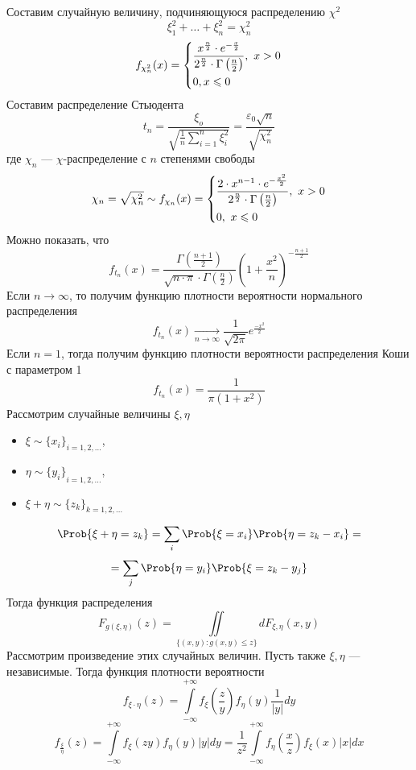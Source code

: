 Составим случайную величину, подчиняющуюся распределению $\chi^2$
\[
	\xi_1^2 + \ldots + \xi_n^2 = \chi_n^2
\]
\[
	f_{\chi_n^2} (x) = \begin{dcases*}
	\frac{x^{\frac{n}{2}} \cdot e^{-\frac{x}{2}} }{2^{\frac{n}{2}} \cdot \Gamma \left( \frac{n}{2} \right)}, \ x > 0 \\
	0, x \leqslant 0
	\end{dcases*}
\]
Составим распределение Стьюдента
\[
	t_n = \frac{\xi_o}{\sqrt{\frac{1}{n} \sum\limits_{i=1}^{n} \xi_i^2}} = \frac{\varepsilon_0 \sqrt{n}}{\sqrt{\chi_n^2}} 
\]
где $\chi_n$ --- $\chi$-распределение с $n$ степенями свободы
\[
	\chi_n = \sqrt{\chi_n^2} \sim f_{\chi_n} (x) = \begin{dcases*}
	\frac{2 \cdot x^{n-1} \cdot e^{-\frac{x^2}{2}}}{2^{\frac{n}{2}} \cdot \Gamma \left( \frac{n}{2} \right)}, \ x > 0\\
	0, \ x \leqslant 0
	\end{dcases*}
\]
Можно показать, что
\[
	f_{t_n} (x) = \frac{\Gamma \left( \frac{n + 1}{2} \right)}{\sqrt{n \cdot \pi} \cdot \Gamma \left( \frac{n}{2} \right)} \left( 1 + \frac{x^2}{n} \right)^{-\frac{n+1}{2}}
\]
Если $n \to \infty$, то получим функцию плотности вероятности нормального распределения
\[
	f_{t_n} (x) \underset{n \to \infty}{\rightarrow} \frac{1}{\sqrt{2\pi}} e^{\frac{-x^2}{2}}
\]
Если $n = 1$, тогда получим функцию плотности вероятности распределения Коши с параметром 1
\[
	f_{t_n} (x) = \frac{1}{\pi (1 + x^2)}
\]
Рассмотрим случайные величины $\xi, \eta$
\begin{itemize}
	\item $\xi \sim {\{ x_i \}}_{i = 1, 2, \ldots}$,
	\item $\eta \sim {\{ y_i \}}_{i = 1, 2, \ldots}$,
	\item $\xi + \eta \sim {\{ z_k \}}_{k = 1, 2, \ldots}$
\end{itemize}
\[
	\Prob \{ \xi + \eta = z_k \} = \sum\limits_{i} \Prob \{ \xi = x_i \} \Prob \{ \eta = z_k - x_i \} = 
\]
\[
	= \sum\limits_{j} \Prob \{ \eta = y_i \} \Prob \{ \xi = z_k - y_j \}
\]
Тогда функция распределения
\[
	F_{g(\xi, \eta)} (z) = \iint\limits_{\{ (x, y) : g(x, y) \leqslant z \}} dF_{\xi, \eta} (x, y)
\]
Рассмотрим произведение этих случайных величин. Пусть также $\xi, \eta$ --- независимые. Тогда функция плотности вероятности
\[
	f_{\xi \cdot \eta} (z) = \int\limits_{-\infty}^{+\infty} f_{\xi} (\frac{z}{y}) f_{\eta} (y) \frac{1}{|y|} dy
\]
\[
	f_{\frac{\xi}{\eta}} (z) = \int\limits_{-\infty}^{+\infty} f_{\xi} (zy) f_{\eta} (y) |y| dy = \frac{1}{z^2} \int\limits_{-\infty}^{+\infty} f_{\eta} \left(\frac{x}{z}\right) f_{\xi} (x) |x| dx
\]
